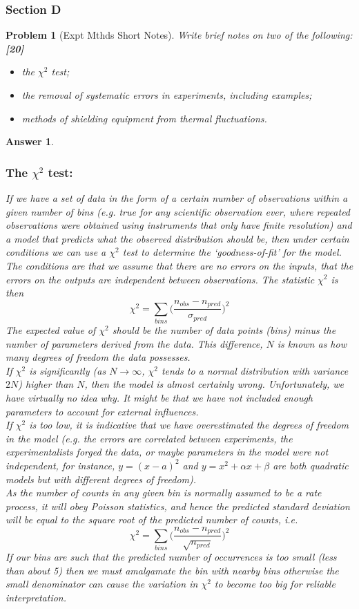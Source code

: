 \documentclass[a4paper]{article}
\newtheorem{ans}{Answer}[subsection]
\theoremstyle{new}
\newtheorem{qns}{Problem}[subsection]
\begin{document}
\subsubsection{Section D}
\begin{qns}[Expt Mthds Short Notes]
Write brief notes on two of the following:\hfill\textbf{[20]}
\begin{itemize}
    \item the $\chi^2$ test;
    \item the removal of systematic errors in experiments, including examples;
    \item methods of shielding equipment from thermal fluctuations.
\end{itemize}
\end{qns}
\begin{ans}\leavevmode
\subsubsection*{The $\chi^2$ test:}
If we have a set of data in the form of a certain number of observations within a given number of bins (e.g. true for any scientific observation ever, where repeated observations were obtained using instruments that only have finite resolution) and a model that predicts what the observed distribution should be, then under certain conditions we can use a $\chi^2$ test to determine the `goodness-of-fit' for the model.\\[5pt]
The conditions are that we assume that there are no errors on the inputs, that the errors on the outputs are independent between observations. The statistic $\chi^2$ is then
$$\chi^2=\sum_{bins}\bigg(\frac{n_{obs}-n_{pred}}{\sigma_{pred}}\bigg)^2$$
The expected value of $\chi^2$ should be the number of data points (bins) minus the number of parameters derived from the data. This difference, $N$ is known as how many degrees of freedom the data possesses.\\[5pt]
If $\chi^2$ is significantly (as $N \rightarrow\infty$, $\chi^2$ tends to a normal distribution with variance $2N$) higher than $N$, then the model is almost certainly wrong. Unfortunately, we have virtually no idea why. It might be that we have not included enough parameters to account for external influences.\\[5pt]
If $\chi^2$ is too low, it is indicative that we have overestimated the degrees of freedom in the model (e.g. the errors are correlated between experiments, the experimentalists forged the data, or maybe parameters in the model were not independent, for instance, $y=(x-a)^2$ and $y=x^2+\alpha x+\beta$ are both quadratic models but with different degrees of freedom).\\[5pt]
As the number of counts in any given bin is normally assumed to be a rate process, it will obey Poisson statistics, and hence the predicted standard deviation will be equal to the square root of the predicted number of counts, i.e.
$$\chi^2=\sum_{bins}\bigg(\frac{n_{obs}-n_{pred}}{\sqrt{n_{pred}}}\bigg)^2$$
If our bins are such that the predicted number of occurrences is too small (less than about 5) then we must amalgamate the bin with nearby bins otherwise the small denominator can cause the variation in $\chi^2$ to become too big for reliable interpretation.
\newpage

\end{ans}
\end{document}
